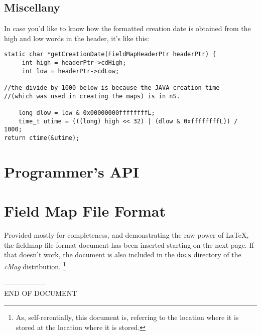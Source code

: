 \documentclass{article}
\begin{document}
\subsection {Miscellany}
In case you'd like to know how the formatted creation date is obtained from the high and low words in the header, it's like this:
\begin{verbatim}
static char *getCreationDate(FieldMapHeaderPtr headerPtr) {
     int high = headerPtr->cdHigh;
     int low = headerPtr->cdLow;

//the divide by 1000 below is because the JAVA creation time 
//(which was used in creating the maps) is in nS.

    long dlow = low & 0x00000000ffffffffL;
    time_t utime = (((long) high << 32) | (dlow & 0xffffffffL)) / 1000;
return ctime(&utime);

\end{verbatim}

\newpage
\appendix
\section{Programmer's API}
\newpage
\section{Field Map File Format}
Provided mostly for completeness, and demonstrating the raw power of \LaTeX, the fieldmap file format document has been inserted starting on the next page. If that doesn't work, the document is also included in the  \texttt{docs} directory of the \textit{cMag} distribution. \footnote{ As, self-rerentially, this document is, referring to the location where it is stored at the location where it is stored.}


------------------\\
END OF DOCUMENT
\end{document}
